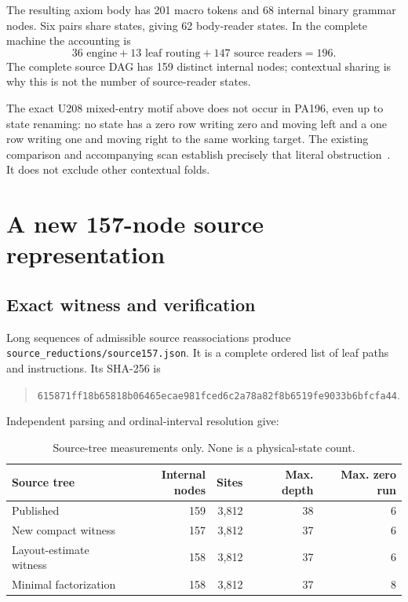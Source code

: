 \documentclass[11pt,letterpaper]{article}
\newcommand{\file}[1]{\texttt{\nolinkurl{#1}}}
\begin{document}
The resulting axiom body has 201 macro tokens and 68 internal binary grammar
nodes. Six pairs share states, giving 62 body-reader states. In the complete
machine the accounting is
\[
 36\text{ engine}+13\text{ leaf routing}+147\text{ source readers}=196.
\]
The complete source DAG has 159 distinct internal nodes; contextual sharing
is why this is not the number of source-reader states.

The exact U208 mixed-entry motif above does not occur in PA196, even up to
state renaming: no state has a zero row writing zero and moving left and a
one row writing one and moving right to the same working target. The
existing comparison and accompanying scan establish precisely that literal
obstruction~\cite{comparison}. It does not exclude other contextual folds.

\section{A new 157-node source representation}

\subsection{Exact witness and verification}

Long sequences of admissible source reassociations produce
\file{source_reductions/source157.json}. It is a complete ordered list of
leaf paths and instructions. Its SHA-256 is
\begin{quote}\small
\nolinkurl{615871ff18b65818b06465ecae981fced6c2a78a82f8b6519fe9033b6bfcfa44}.
\end{quote}
Independent parsing and ordinal-interval resolution give:

\begin{table}[ht]
\centering
\begin{tabular}{@{}lrrrr@{}}
\toprule
Source tree & Internal nodes & Sites & Max. depth & Max. zero run\\
\midrule
Published &159&3,812&38&6\\
New compact witness &157&3,812&37&6\\
Layout-estimate witness &158&3,812&37&6\\
Minimal factorization &158&3,812&37&8\\
\bottomrule
\end{tabular}
\caption{Source-tree measurements only. None is a physical-state count.}
\end{table}
\end{document}
